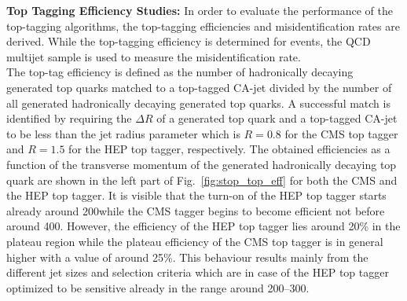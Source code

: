 \begin{description}
\item {\textbf{Top Tagging Efficiency Studies:}} In order to evaluate the performance of the top-tagging algorithms, the top-tagging efficiencies and misidentification rates are derived. While the top-tagging efficiency is determined for \ttbar events, the QCD multijet sample is used to measure the misidentification rate. \\
The top-tag efficiency is defined as the number of hadronically decaying generated top quarks matched to a top-tagged CA-jet divided by the number of all generated hadronically decaying generated top quarks. A successful match is identified by requiring the $\Delta R$ of a generated top quark and a top-tagged CA-jet to be less than the jet radius parameter which is $R=0.8$ for the CMS top tagger and $R=1.5$ for the HEP top tagger, respectively. The obtained efficiencies as a function of the transverse momentum of the generated hadronically decaying top quark are shown in the left part of Fig.~\ref{fig:stop_top_eff} for both the CMS and the HEP top tagger. It is visible that the turn-on of the HEP top tagger starts already around 200\gev while the CMS tagger begins to become efficient not before around 400\gev. However, the efficiency of the HEP top tagger lies around 20\% in the plateau region while the plateau efficiency of the CMS top tagger is in general higher with a value of around 25\%. This behaviour results mainly from the different jet sizes and selection criteria which are in case of the HEP top tagger optimized to be sensitive already in the \pt range around 200--300\gev.
\begin{figure}[!t]
  \centering
{}
\end{figure}
\end{description}
